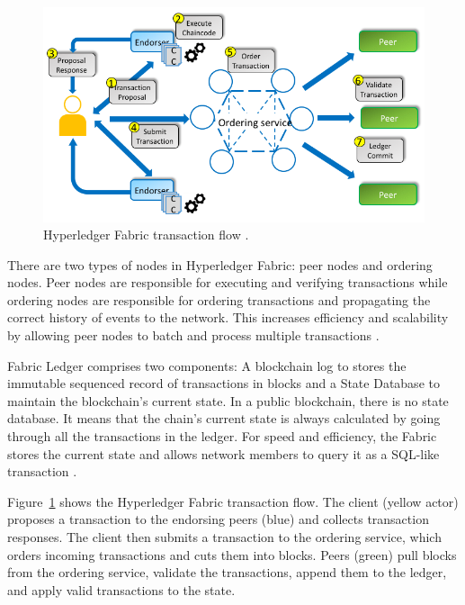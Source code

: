 \begin{figure}[htbp]
\begin{center}
  \includegraphics[scale=0.45]{images/Hyperledger-Fabric-high-level-transaction-flow.png}
\caption{Hyperledger Fabric  transaction flow \cite{manevich2018service}.}
\label{fig:hyperledgerFlow}
\end{center}
\end{figure}

There are two types of nodes in Hyperledger Fabric: peer nodes and ordering nodes. Peer nodes are responsible for executing and verifying transactions while ordering nodes are responsible for ordering transactions and propagating the correct history of events to the network. This increases efficiency and scalability by allowing peer nodes to batch and process multiple transactions \cite{buterin2016smart}. 

Fabric Ledger comprises two components: A blockchain log to stores the immutable sequenced record of transactions in blocks and a State Database to maintain the blockchain's current state. In a public blockchain, there is no state database. It means that the chain's current state is always calculated by going through all the transactions in the ledger. For speed and efficiency, the Fabric stores the current state and allows network members to query it as a SQL-like transaction \cite{blockgeeks2016blockchain}. 

Figure~\ref{fig:hyperledgerFlow} shows the Hyperledger Fabric transaction flow. The client (yellow actor) proposes a transaction to the endorsing peers (blue) and collects transaction responses. The client then submits a transaction to the ordering service, which orders incoming transactions and cuts them into blocks. Peers (green) pull blocks from the ordering service, validate the transactions, append them to the ledger, and apply valid transactions to the state.

